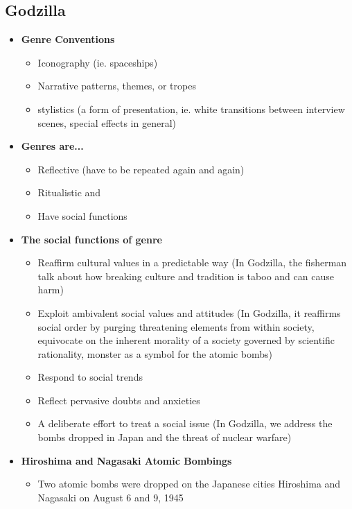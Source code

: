 \documentclass[11pt,fleqn]{book} %
\begin{document}
\subsection{Godzilla}
\begin{itemize}
    \item \textbf{Genre Conventions}
    \begin{itemize}
        \item Iconography (ie. spaceships)
        \item Narrative patterns, themes, or tropes
        \item stylistics (a form of presentation, ie. white transitions between interview scenes, special effects in general)
    \end{itemize}
    \item \textbf{Genres are...}
    \begin{itemize}
        \item Reflective (have to be repeated again and again)
        \item Ritualistic and 
        \item Have social functions
    \end{itemize}
    \item \textbf{The social functions of genre}
    \begin{itemize}
        \item Reaffirm cultural values in a predictable way (In Godzilla, the fisherman talk about how breaking culture and tradition is taboo and can cause harm)
        \item Exploit ambivalent social values and attitudes (In Godzilla, it reaffirms social order by purging threatening elements from within society, equivocate on the inherent morality of a society governed by scientific rationality, monster as a symbol for the atomic bombs)
        \item Respond to social trends
        \item Reflect pervasive doubts and anxieties
        \item A deliberate effort to treat a social issue (In Godzilla, we address the bombs dropped in Japan and the threat of nuclear warfare)
    \end{itemize}
    \item \textbf{Hiroshima and Nagasaki Atomic Bombings}
    \begin{itemize}
        \item Two atomic bombs were dropped on the Japanese cities Hiroshima and Nagasaki
on August 6 and 9, 1945

\end{itemize}
\end{itemize}
\end{document}
